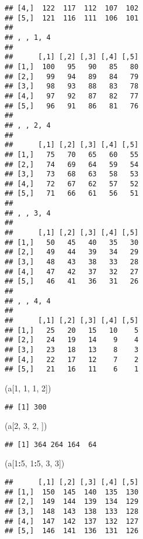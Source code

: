 \documentclass[]{article}
\newenvironment{Shaded}{\begin{snugshade}}{\end{snugshade}}
\newcommand{\DecValTok}[1]{\textcolor[rgb]{0.00,0.00,0.81}{#1}}
\newcommand{\NormalTok}[1]{#1}
\newcommand{\OperatorTok}[1]{\textcolor[rgb]{0.81,0.36,0.00}{\textbf{#1}}}
\begin{document}
\begin{verbatim}
## [4,]  122  117  112  107  102
## [5,]  121  116  111  106  101
## 
## , , 1, 4
## 
##      [,1] [,2] [,3] [,4] [,5]
## [1,]  100   95   90   85   80
## [2,]   99   94   89   84   79
## [3,]   98   93   88   83   78
## [4,]   97   92   87   82   77
## [5,]   96   91   86   81   76
## 
## , , 2, 4
## 
##      [,1] [,2] [,3] [,4] [,5]
## [1,]   75   70   65   60   55
## [2,]   74   69   64   59   54
## [3,]   73   68   63   58   53
## [4,]   72   67   62   57   52
## [5,]   71   66   61   56   51
## 
## , , 3, 4
## 
##      [,1] [,2] [,3] [,4] [,5]
## [1,]   50   45   40   35   30
## [2,]   49   44   39   34   29
## [3,]   48   43   38   33   28
## [4,]   47   42   37   32   27
## [5,]   46   41   36   31   26
## 
## , , 4, 4
## 
##      [,1] [,2] [,3] [,4] [,5]
## [1,]   25   20   15   10    5
## [2,]   24   19   14    9    4
## [3,]   23   18   13    8    3
## [4,]   22   17   12    7    2
## [5,]   21   16   11    6    1
\end{verbatim}

\begin{Shaded}
\begin{Highlighting}[]
\NormalTok{(a[}\DecValTok{1}\NormalTok{, }\DecValTok{1}\NormalTok{, }\DecValTok{1}\NormalTok{, }\DecValTok{2}\NormalTok{]) }
\end{Highlighting}
\end{Shaded}

\begin{verbatim}
## [1] 300
\end{verbatim}

\begin{Shaded}
\begin{Highlighting}[]
\NormalTok{(a[}\DecValTok{2}\NormalTok{, }\DecValTok{3}\NormalTok{, }\DecValTok{2}\NormalTok{, ])}
\end{Highlighting}
\end{Shaded}

\begin{verbatim}
## [1] 364 264 164  64
\end{verbatim}

\begin{Shaded}
\begin{Highlighting}[]
\NormalTok{(a[}\DecValTok{1}\OperatorTok{:}\DecValTok{5}\NormalTok{, }\DecValTok{1}\OperatorTok{:}\DecValTok{5}\NormalTok{, }\DecValTok{3}\NormalTok{, }\DecValTok{3}\NormalTok{])}
\end{Highlighting}
\end{Shaded}

\begin{verbatim}
##      [,1] [,2] [,3] [,4] [,5]
## [1,]  150  145  140  135  130
## [2,]  149  144  139  134  129
## [3,]  148  143  138  133  128
## [4,]  147  142  137  132  127
## [5,]  146  141  136  131  126
\end{verbatim}
\end{document}
